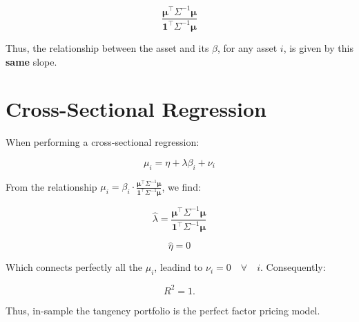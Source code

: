 \documentclass{article}
\begin{document}
\[
\frac{\boldsymbol{\mu}^\top \Sigma^{-1} \boldsymbol{\mu}}{\mathbf{1}^\top \Sigma^{-1} \boldsymbol{\mu}}
\]

Thus, the relationship between the asset and its $\beta$, for any asset $i$, is given by this \textbf{same} slope.

\section{Cross-Sectional Regression}
When performing a cross-sectional regression:

\[
\mu_i = \eta + \lambda \beta_i + \nu_i
\]

From the relationship \( \mu_i = \beta_i \cdot \frac{\boldsymbol{\mu}^\top \Sigma^{-1} \boldsymbol{\mu}}{\mathbf{1}^\top \Sigma^{-1} \boldsymbol{\mu}} \), we find:

\[
\hat{\lambda} = \frac{\boldsymbol{\mu}^\top \Sigma^{-1} \boldsymbol{\mu}}{\mathbf{1}^\top \Sigma^{-1} \boldsymbol{\mu}}
\]

\[
\hat{\eta} = 0
\]

Which connects perfectly all the $\mu_i$, leadind to $\nu_i = 0 \quad \forall \quad i$. Consequently:

\[
R^2 = 1.
\]

Thus, in-sample the tangency portfolio is the perfect factor pricing model.
\end{document}
